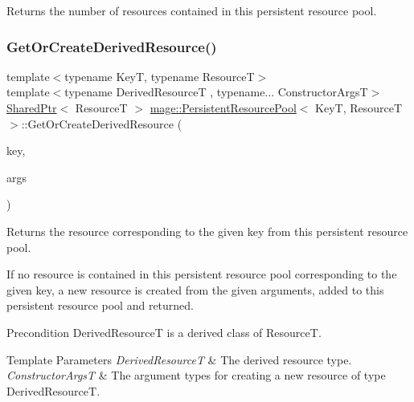 Returns the number of resources contained in this persistent resource pool. \hypertarget{classmage_1_1_persistent_resource_pool_a1423605c78293295129fde4afa18637a}{}\label{classmage_1_1_persistent_resource_pool_a1423605c78293295129fde4afa18637a} 
\subsubsection{\texorpdfstring{Get\+Or\+Create\+Derived\+Resource()}{GetOrCreateDerivedResource()}}
{\footnotesize\ttfamily template$<$typename KeyT, typename ResourceT$>$ \\
template$<$typename Derived\+ResourceT , typename... Constructor\+ArgsT$>$ \\
\hyperlink{namespacemage_a1e01ae66713838a7a67d30e44c67703e}{Shared\+Ptr}$<$ ResourceT $>$ \hyperlink{classmage_1_1_persistent_resource_pool}{mage\+::\+Persistent\+Resource\+Pool}$<$ KeyT, ResourceT $>$\+::Get\+Or\+Create\+Derived\+Resource (\begin{DoxyParamCaption}\item[{const KeyT \&}]{key,  }\item[{Constructor\+ArgsT \&\&...}]{args }\end{DoxyParamCaption})}

Returns the resource corresponding to the given key from this persistent resource pool.

If no resource is contained in this persistent resource pool corresponding to the given key, a new resource is created from the given arguments, added to this persistent resource pool and returned.

\begin{DoxyPrecond}{Precondition}
{\ttfamily Derived\+ResourceT} is a derived class of {\ttfamily ResourceT}. 
\end{DoxyPrecond}

\begin{DoxyTemplParams}{Template Parameters}
{\em Derived\+ResourceT} & The derived resource type. \\
\hline
{\em Constructor\+ArgsT} & The argument types for creating a new resource of type {\ttfamily Derived\+ResourceT}. \\
\hline
\end{DoxyTemplParams}

